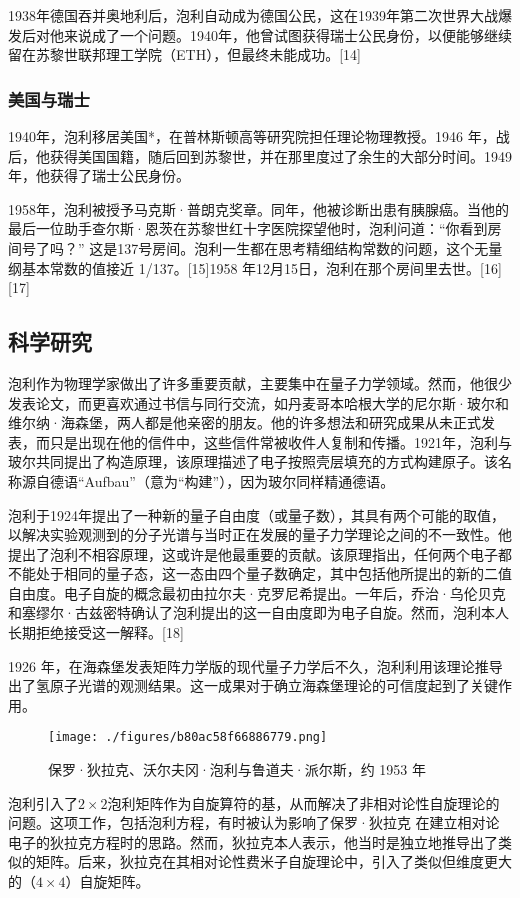1938年德国吞并奥地利后，泡利自动成为德国公民，这在1939年第二次世界大战爆发后对他来说成了一个问题。1940年，他曾试图获得瑞士公民身份，以便能够继续留在苏黎世联邦理工学院（ETH），但最终未能成功。[14]
\subsubsection{美国与瑞士} 
1940年，泡利移居美国*，在普林斯顿高等研究院担任理论物理教授。1946 年，战后，他获得美国国籍，随后回到苏黎世，并在那里度过了余生的大部分时间。1949 年，他获得了瑞士公民身份。

1958年，泡利被授予马克斯·普朗克奖章。同年，他被诊断出患有胰腺癌。当他的最后一位助手查尔斯·恩茨在苏黎世红十字医院探望他时，泡利问道：“你看到房间号了吗？” 这是137号房间。泡利一生都在思考精细结构常数的问题，这个无量纲基本常数的值接近 1/137。[15]1958 年12月15日，泡利在那个房间里去世。[16][17]
\subsection{科学研究}
泡利作为物理学家做出了许多重要贡献，主要集中在量子力学领域。然而，他很少发表论文，而更喜欢通过书信与同行交流，如丹麦哥本哈根大学的尼尔斯·玻尔和维尔纳·海森堡，两人都是他亲密的朋友。他的许多想法和研究成果从未正式发表，而只是出现在他的信件中，这些信件常被收件人复制和传播。1921年，泡利与玻尔共同提出了构造原理，该原理描述了电子按照壳层填充的方式构建原子。该名称源自德语“Aufbau”（意为“构建”），因为玻尔同样精通德语。

泡利于1924年提出了一种新的量子自由度（或量子数），其具有两个可能的取值，以解决实验观测到的分子光谱与当时正在发展的量子力学理论之间的不一致性。他提出了泡利不相容原理，这或许是他最重要的贡献。该原理指出，任何两个电子都不能处于相同的量子态，这一态由四个量子数确定，其中包括他所提出的新的二值自由度。电子自旋的概念最初由拉尔夫·克罗尼希提出。一年后，乔治·乌伦贝克和塞缪尔·古兹密特确认了泡利提出的这一自由度即为电子自旋。然而，泡利本人长期拒绝接受这一解释。[18]  

1926 年，在海森堡发表矩阵力学版的现代量子力学后不久，泡利利用该理论推导出了氢原子光谱的观测结果。这一成果对于确立海森堡理论的可信度起到了关键作用。
\begin{figure}[ht]
\centering
\texttt{[image: ./figures/b80ac58f66886779.png]}
\caption{保罗·狄拉克、沃尔夫冈·泡利与鲁道夫·派尔斯，约 1953 年} \label{fig_Pauli2_3}
\end{figure}
泡利引入了\(2\times 2\)泡利矩阵作为自旋算符的基，从而解决了非相对论性自旋理论的问题。这项工作，包括泡利方程，有时被认为影响了保罗·狄拉克 在建立相对论电子的狄拉克方程时的思路。然而，狄拉克本人表示，他当时是独立地推导出了类似的矩阵。后来，狄拉克在其相对论性费米子自旋理论中，引入了类似但维度更大的（\(4\times4\)）自旋矩阵。

